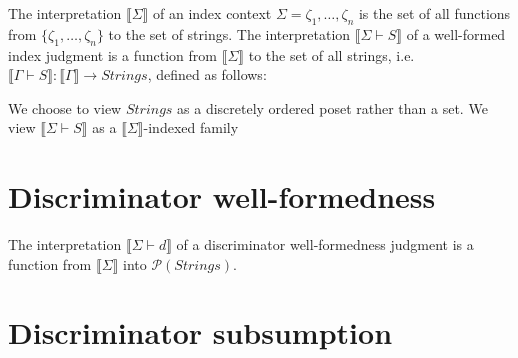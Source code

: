 \documentclass{article}
\newcommand{\sem}[1]{\llbracket #1 \rrbracket}
\begin{document}
The interpretation $\sem{\Sigma}$ of an index context $\Sigma = \zeta_1, \ldots, \zeta_n$ is the set of all functions from $\{ \zeta_1, \ldots, \zeta_n \}$ to the set of strings. The interpretation $\sem{\Sigma \vdash S}$ of a well-formed index judgment is a function from $\sem{\Sigma}$ to the set of all strings, i.e. $\sem{\Gamma \vdash S} : \sem{\Gamma} \to \mathit{Strings}$, defined as follows:
We choose to view $\mathit{Strings}$ as a discretely ordered poset rather than a set. We view $\sem{\Sigma \vdash S}$ as a $\sem{\Sigma}$-indexed family 

\section*{Discriminator well-formedness}


The interpretation $\sem{\Sigma \vdash d}$ of a discriminator well-formedness judgment is a function from $\sem{\Sigma}$ into $\mathcal P(\mathit{Strings})$. 

\section*{Discriminator subsumption}

\end{document}
